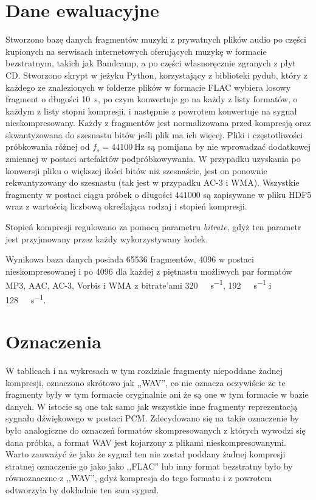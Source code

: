 \documentclass[pl,12pt]{aghdpl}
\let\Oldsection\section%
\renewcommand{\section}{\FloatBarrier\Oldsection}
\begin{document}
\section{Dane ewaluacyjne}
Stworzono bazę danych fragmentów muzyki z prywatnych plików audio po
części kupionych na serwisach internetowych oferujących muzykę w formacie
bezstratnym, takich jak Bandcamp, a po części własnoręcznie zgranych z płyt
CD. Stworzono skrypt w jeżyku Python, korzystający z biblioteki pydub, który
z każdego ze znalezionych w folderze plików w formacie FLAC wybiera losowy
fragment o długości \SI{10}{\second}, po czym konwertuje go na każdy z listy
formatów, o każdym z listy stopni kompresji, i następnie z powrotem konwertuje
na sygnał nieskompresowany. Każdy z fragmentów jest normalizowana przed
kompresją oraz skwantyzowana do szesnastu bitów jeśli plik ma ich więcej. Pliki
i częstotliwości próbkowania różnej od $f_s = \SI{44100}{\hertz}$ są pomijana
by nie wprowadzać dodatkowej zmiennej w postaci artefaktów podpróbkowywania. W
przypadku uzyskania po konwersji pliku o większej ilości bitów niż szesnaście,
jest on ponownie rekwantyzowany do szesnastu (tak jest w przypadku AC-3 i WMA).
Wszystkie fragmenty w postaci ciągu próbek o długości $441000$ są zapisywane w
pliku HDF5 wraz z wartością liczbową określająca rodzaj i stopień kompresji.  

Stopień kompresji regulowano za pomocą parametru \textit{bitrate}, gdyż ten
parametr jest przyjmowany przez każdy wykorzystywany kodek.

Wynikowa baza danych posiada 65536 fragmentów, 4096 w postaci
nieskompresowanej i po 4096 dla każdej z piętnastu możliwych par formatów MP3,
AAC, AC-3, Vorbis i WMA z bitrate'ami \SI{320}{\kibi\bit\per\second},
\SI{192}{\kibi\bit\per\second} i \SI{128}{\kibi\bit\per\second}.

\section{Oznaczenia}

W tablicach i na wykresach w tym rozdziale fragmenty niepoddane żadnej kompresji,
oznaczono skrótowo jak ,,WAV'', co nie oznacza oczywiście że te fragmenty były w tym
formacie oryginalnie ani że są one w tym formacie w bazie danych. W istocie są
one tak samo jak wszystkie inne fragmenty reprezentacją sygnału dźwiękowego w
postaci PCM. Zdecydowano się na takie oznaczenie by było analogiczne do
oznaczeń formatów skompresowanych z których wywodzi się dana próbka, a
format WAV jest kojarzony z plikami nieskompresowanymi. Warto zauważyć że jako
że sygnał ten nie został poddany żadnej kompresji stratnej oznaczenie go jako
jako ,,FLAC'' lub inny format bezstratny było by równoznaczne z ,,WAV'', gdyż
kompresja do tego formatu i z powrotem odtworzyła by dokładnie ten sam sygnał.
\end{document}

